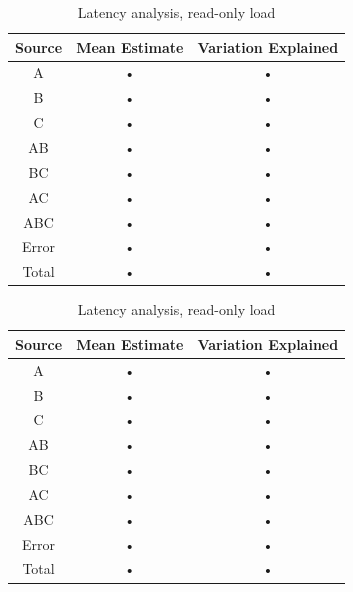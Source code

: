 \documentclass[11pt,a4paper]{article}
\begin{document}
\begin{table}
\begin{minipage}{.5\textwidth}
\centering
	\begin{tabular}{|c|c|c|}
	\hline 
	{\small Source} & {\small Mean Estimate} & {\small Variation Explained} \\ 
	\hline 
	A & • & • \\ 
	\hline 
	B & • & • \\ 
	\hline 
	C & • & • \\ 
	\hline 
	AB & • & • \\ 
	\hline 
	BC & • & • \\ 
	\hline 
	AC & • & • \\ 
	\hline 
	ABC & • & • \\ 
	\hline 
	Error & • & • \\ 
	\hline 
	Total & • & • \\ 
	\hline 
	\end{tabular} \caption{Throughput analysis, read-only load} \label{tab:2k-tpt-ro}
\end{minipage}%
\begin{minipage}{.5\textwidth}
\centering
	\begin{tabular}{|c|c|c|}
	\hline 
	{\small Source} & {\small Mean Estimate} & {\small Variation Explained} \\ 
	\hline 
	A & • & • \\ 
	\hline 
	B & • & • \\ 
	\hline 
	C & • & • \\ 
	\hline 
	AB & • & • \\ 
	\hline 
	BC & • & • \\ 
	\hline 
	AC & • & • \\ 
	\hline 
	ABC & • & • \\ 
	\hline 
	Error & • & • \\ 
	\hline 
	Total & • & • \\ 
	\hline 
	\end{tabular} \caption{Latency analysis, read-only load} \label{tab:2k-lat-ro}
\end{minipage}
\end{table}\label{tab:2k-ro}
\end{document}

